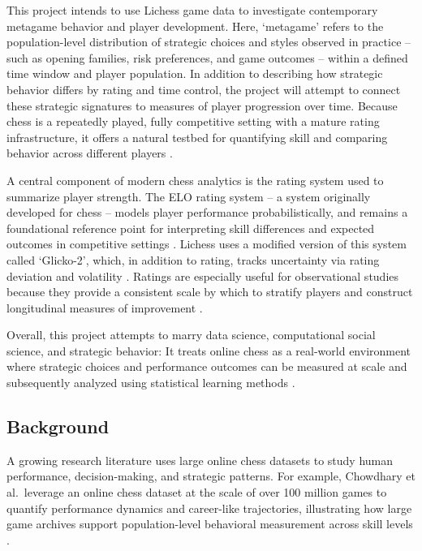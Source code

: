 \documentclass[
  12pt]{article}
\begin{document}
This project intends to use Lichess game data to investigate
contemporary metagame behavior and player development. Here, `metagame'
refers to the population-level distribution of strategic choices and
styles observed in practice -- such as opening families, risk
preferences, and game outcomes -- within a defined time window and
player population. In addition to describing how strategic behavior
differs by rating and time control, the project will attempt to connect
these strategic signatures to measures of player progression over time.
Because chess is a repeatedly played, fully competitive setting with a
mature rating infrastructure, it offers a natural testbed for
quantifying skill and comparing behavior across different players
\citep{lichessRatingSystems, glickmanGlicko2Desc}.

A central component of modern chess analytics is the rating system used
to summarize player strength. The ELO rating system -- a system
originally developed for chess -- models player performance
probabilistically, and remains a foundational reference point for
interpreting skill differences and expected outcomes in competitive
settings \citep{elo1978rating, fideElo2025}. Lichess uses a modified
version of this system called `Glicko-2', which, in addition to rating,
tracks uncertainty via rating deviation and volatility
\citep{lichessRatingSystems, glickmanGlicko2Desc}. Ratings are
especially useful for observational studies because they provide a
consistent scale by which to stratify players and construct longitudinal
measures of improvement \citep{glickmanGlicko2Desc}.

Overall, this project attempts to marry data science, computational
social science, and strategic behavior: It treats online chess as a
real-world environment where strategic choices and performance outcomes
can be measured at scale and subsequently analyzed using statistical
learning methods \citep{edelmann2020css, watts2014css}.

\subsection{Background}\label{sec-background}

A growing research literature uses large online chess datasets to study
human performance, decision-making, and strategic patterns. For example,
Chowdhary et al.~leverage an online chess dataset at the scale of over
100 million games to quantify performance dynamics and career-like
trajectories, illustrating how large game archives support
population-level behavioral measurement across skill levels
\citep{chowdhary2023performance}.
\end{document}
